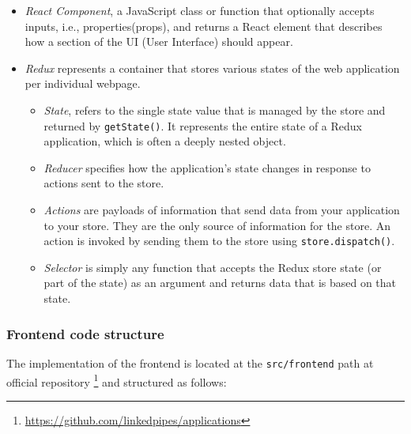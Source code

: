 \begin{itemize}
    \item \textit{React Component}, a JavaScript class or function that optionally accepts inputs, i.e., properties(props), and returns a React element that describes how a section of the UI (User Interface) should appear. 
    \item \textit{Redux} represents a container that stores various states of the web application per individual webpage.
        \begin{itemize}
            \item \textit{State}, refers to the single state value that is managed by the store and returned by \texttt{getState()}. It represents the entire state of a Redux application, which is often a deeply nested object.
            \item \textit{Reducer} specifies how the application's state changes in response to actions sent to the store.
            \item \textit{Actions} are payloads of information that send data from your application to your store. They are the only source of information for the store. An action is invoked by sending them to the store using \texttt{store.dispatch()}.
            \item \textit{Selector} is simply any function that accepts the Redux store state (or part of the state) as an argument and returns data that is based on that state.
        \end{itemize}
\end{itemize}

\subsubsection{Frontend code structure}
\label{ssssec:lpa_frontend_code_structure}

The implementation of the \lpa{} frontend is located at the \texttt{src/frontend} path at official \lpa{} repository \footnote{\url{https://github.com/linkedpipes/applications}}  and structured as follows:

